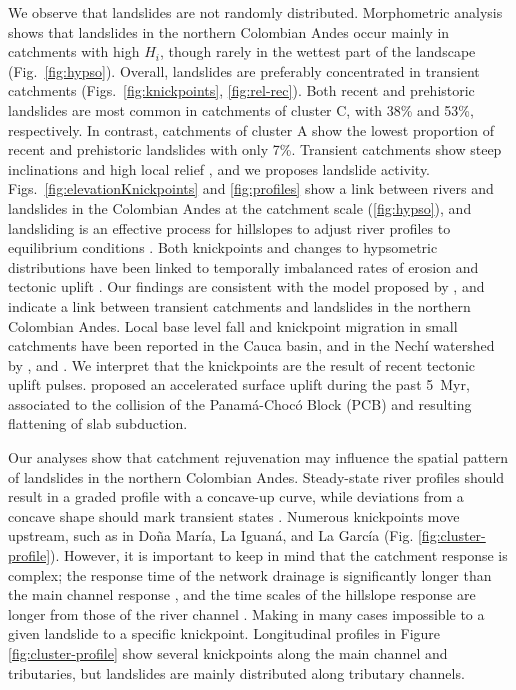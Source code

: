 \documentclass[draft]{agujournal2019}
\begin{document}
\par We observe that landslides are not randomly distributed. Morphometric analysis shows that landslides in the northern Colombian Andes occur mainly in catchments with high $H_i$, though rarely in the wettest part of the landscape (Fig.~\ref{fig:hypso}). Overall, landslides are preferably concentrated in transient catchments (Figs.~\ref{fig:knickpoints}, \ref{fig:rel-rec}). Both recent and prehistoric landslides are most common in catchments of cluster C, with 38\% and 53\%, respectively. In contrast, catchments of cluster A show the lowest proportion of recent and prehistoric landslides with only 7\%. Transient catchments show steep inclinations and high local relief \cite{Whipple1999, matos2016}, and we proposes landslide activity. Figs.~\ref{fig:elevationKnickpoints} and \ref{fig:profiles} show a link between rivers and landslides in the Colombian Andes at the catchment scale (\ref{fig:hypso}), and landsliding is an effective process for hillslopes to adjust river profiles to equilibrium conditions \cite{burbank1996}. Both knickpoints and changes to hypsometric distributions have been linked to temporally imbalanced rates of erosion and tectonic uplift \cite{perez-pena2009}. Our findings are consistent with the model proposed by , and indicate a link between transient catchments and landslides in the northern Colombian Andes. Local base level fall and knickpoint migration in small catchments have been reported in the Cauca basin, and in the Nechí watershed by ,  and . We interpret that the knickpoints are the result of recent tectonic uplift pulses.  proposed an accelerated surface uplift during the past 5~Myr, associated to the collision of the Panamá-Chocó Block (PCB) and resulting flattening of slab subduction.

\par Our analyses show that catchment rejuvenation may influence the spatial pattern of landslides in the northern Colombian Andes. Steady-state river profiles should result in a graded profile with a concave-up curve, while deviations from a concave shape should mark transient states \cite{Whipple1999, Wobus2006}. Numerous knickpoints move upstream, such as in Doña María, La Iguaná, and La García (Fig. \ref{fig:cluster-profile}). However, it is important to keep in mind that the catchment response is complex; the response time of the network drainage is significantly longer than the main channel response \cite{Willett2014}, and the time scales of the hillslope response are longer from those of the river channel \cite{fiona2019}. Making in many cases impossible to a given landslide to a specific knickpoint. Longitudinal profiles in Figure \ref{fig:cluster-profile} show several knickpoints along the main channel and tributaries, but landslides are mainly distributed along tributary channels.
\end{document}
